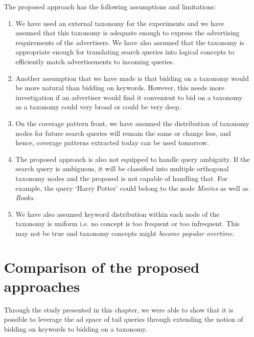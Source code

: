 The proposed approach has the following assumptions and limitations:
\begin{enumerate}[label=(\roman*).]

\item  We have used an external taxonomy for the experiments and we have assumed that this taxonomy is adequate enough to express the advertising requirements of the advertisers. We have also assumed that the taxonomy is appropriate enough for translating search queries into logical concepts to efficiently match advertisements to incoming queries.

\item Another assumption that we have made is that bidding on a taxonomy would be more natural than bidding on keywords. However, this needs more investigation if an advertiser would find it convenient to bid on a taxonomy as a taxonomy could very broad or could be very deep.

\item On the coverage pattern front, we have assumed the distribution of taxonomy nodes for future search queries will remain the same or change less, and hence, coverage patterns extracted today can be used tomorrow.


\item The proposed approach is also not equipped to handle query ambiguity. If the search query is ambiguous, it will be classified into multiple orthogonal taxonomy nodes and the proposed is not capable of handling that. For example, the query `Harry Potter' could belong to the node \textit{Movies} as well as \textit{Books}.

\item We have also assumed keyword distribution within each node of the taxonomy is uniform i.e. no concept is too frequent or too infrequent. This may not be true and taxonomy concepts might \textit{become popular overtime}.
    
\end{enumerate}





\section{Comparison of the proposed approaches}

\label{ch5Comparison}
Through the study presented in this chapter, we were able to show that it is possible to leverage the ad space of tail queries through extending the notion of bidding on keywords to bidding on a taxonomy.

